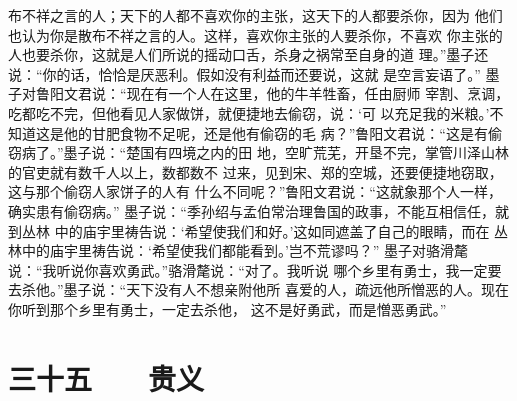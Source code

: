 \documentclass[12pt,UTF8]{ctexbook}
\begin{document}
布不祥之言的人；天下的人都不喜欢你的主张，这天下的人都要杀你，因为 
他们也认为你是散布不祥之言的人。这样，喜欢你主张的人要杀你，不喜欢 
你主张的人也要杀你，这就是人们所说的摇动口舌，杀身之祸常至自身的道 
理。”墨子还说：“你的话，恰恰是厌恶利。假如没有利益而还要说，这就 
是空言妄语了。” 
墨子对鲁阳文君说：“现在有一个人在这里，他的牛羊牲畜，任由厨师 
宰割、烹调，吃都吃不完，但他看见人家做饼，就便捷地去偷窃，说：‘可 
以充足我的米粮。’不知道这是他的甘肥食物不足呢，还是他有偷窃的毛 
病？”鲁阳文君说：“这是有偷窃病了。”墨子说：“楚国有四境之内的田 
地，空旷荒芜，开垦不完，掌管川泽山林的官吏就有数千人以上，数都数不 
过来，见到宋、郑的空城，还要便捷地窃取，这与那个偷窃人家饼子的人有 
什么不同呢？”鲁阳文君说：“这就象那个人一样，确实患有偷窃病。” 
墨子说：“季孙绍与孟伯常治理鲁国的政事，不能互相信任，就到丛林 
中的庙宇里祷告说：‘希望使我们和好。’这如同遮盖了自己的眼睛，而在 
丛林中的庙宇里祷告说：‘希望使我们都能看到。’岂不荒谬吗？” 
墨子对骆滑氂说：“我听说你喜欢勇武。”骆滑氂说：“对了。我听说 
哪个乡里有勇士，我一定要去杀他。”墨子说：“天下没有人不想亲附他所 
喜爱的人，疏远他所憎恶的人。现在你听到那个乡里有勇士，一定去杀他， 
这不是好勇武，而是憎恶勇武。” 

\chapter{三十五　　贵义}
\end{document}
